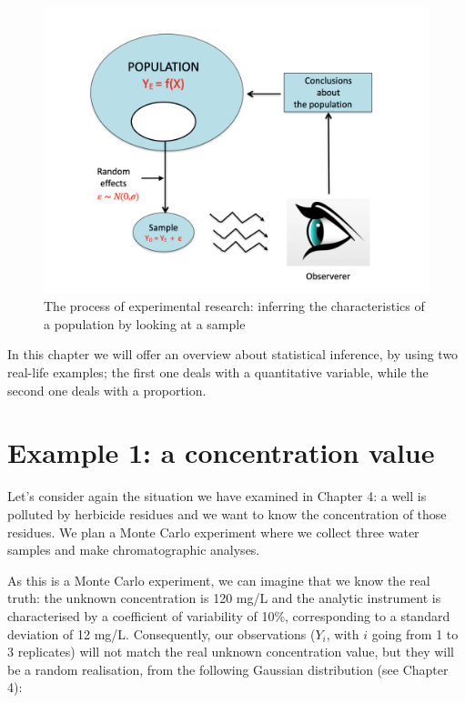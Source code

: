 \documentclass[a4paper,12pt,oneside]{book}
\begin{document}
\begin{figure}

{\centering \includegraphics[width=0.75\linewidth]{_images/ExperimentalError} 

}

\caption{The process of experimental research: inferring the characteristics of a population by looking at a sample}\label{fig:figName61}
\end{figure}

In this chapter we will offer an overview about statistical inference, by using two real-life examples; the first one deals with a quantitative variable, while the second one deals with a proportion.

\hypertarget{example-1-a-concentration-value}{%
\section{Example 1: a concentration value}\label{example-1-a-concentration-value}}

Let's consider again the situation we have examined in Chapter 4: a well is polluted by herbicide residues and we want to know the concentration of those residues. We plan a Monte Carlo experiment where we collect three water samples and make chromatographic analyses.

As this is a Monte Carlo experiment, we can imagine that we know the real truth: the unknown concentration is 120 mg/L and the analytic instrument is characterised by a coefficient of variability of 10\%, corresponding to a standard deviation of 12 mg/L. Consequently, our observations (\(Y_i\), with \(i\) going from 1 to 3 replicates) will not match the real unknown concentration value, but they will be a random realisation, from the following Gaussian distribution (see Chapter 4):
\end{document}

